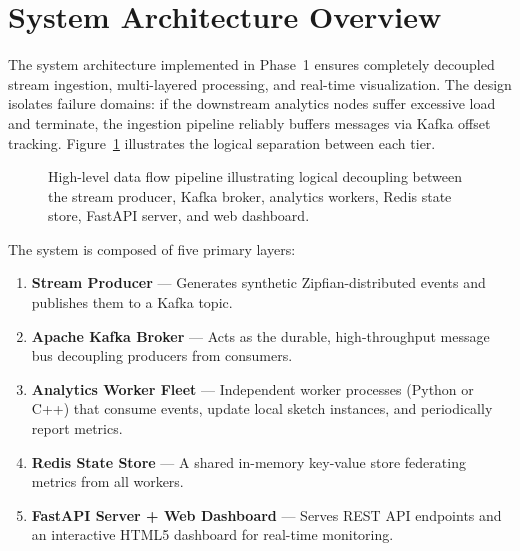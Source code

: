 \section{System Architecture Overview}

The system architecture implemented in Phase~1 ensures completely decoupled stream ingestion, multi-layered processing, and real-time visualization. The design isolates failure domains: if the downstream analytics nodes suffer excessive load and terminate, the ingestion pipeline reliably buffers messages via Kafka offset tracking. Figure~\ref{fig:arch_diagram} illustrates the logical separation between each tier.

\begin{figure}[htbp]
    \centering
    \caption{High-level data flow pipeline illustrating logical decoupling between the stream producer, Kafka broker, analytics workers, Redis state store, FastAPI server, and web dashboard.}
    \label{fig:arch_diagram}
\end{figure}

The system is composed of five primary layers:
\begin{enumerate}
    \item \textbf{Stream Producer} --- Generates synthetic Zipfian-distributed events and publishes them to a Kafka topic.
    \item \textbf{Apache Kafka Broker} --- Acts as the durable, high-throughput message bus decoupling producers from consumers.
    \item \textbf{Analytics Worker Fleet} --- Independent worker processes (Python or C++) that consume events, update local sketch instances, and periodically report metrics.
    \item \textbf{Redis State Store} --- A shared in-memory key-value store federating metrics from all workers.
    \item \textbf{FastAPI Server + Web Dashboard} --- Serves REST API endpoints and an interactive HTML5 dashboard for real-time monitoring.
\end{enumerate}

